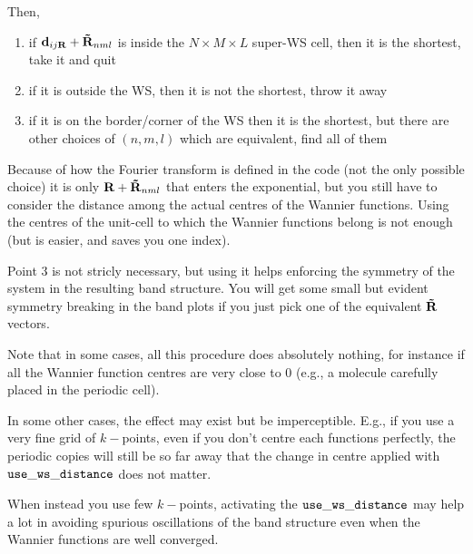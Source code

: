 Then,
\begin{enumerate}
\item if $\bm{\mathrm{d}}_{ij\bm{\mathrm{R}}}+ \bm{\mathrm{\tilde R}}_{nml}$ is inside the  
  $N\times M \times L$ super-WS cell, then it is the shortest, take it and quit

\item if it is outside the WS, then it is not the shortest, throw it away

\item if it is on the border/corner of the WS then it is the shortest, but there 
are other choices of $(n,m,l)$ which are equivalent, find all of them
\end{enumerate}

Because of how the Fourier transform is defined in the \wannier{} code (not the only 
possible choice) it is only $\bm{\mathrm{R}}+\bm{\mathrm{\tilde R}}_{nml}$ 
that enters the exponential, but you still have to consider the distance 
among the actual centres of the Wannier functions. Using 
the centres of the unit-cell to which the Wannier functions belong 
is not enough (but is easier, and saves you one index).

Point 3 is not stricly necessary, but using it helps enforcing the 
symmetry of the system in the resulting band structure. You 
will get some small but evident symmetry breaking in the band 
plots if you just pick one of the equivalent $\bm{\mathrm{\tilde R}}$ vectors.

Note that in some cases, all this procedure does absolutely nothing,
for instance if all the Wannier function centres are very close to 0 
(e.g., a molecule carefully placed in the periodic cell).

In some other cases, the effect may exist but be imperceptible. E.g.,
if you use a very fine grid of $k-$points, even if you don't centre 
each functions perfectly, the periodic copies will still be so far away 
that the change in centre applied with $\tt use\_ws\_distance$ does not matter. 

When instead you use few $k-$points, activating the $\tt use\_ws\_distance$
may help a lot in avoiding spurious oscillations of the band structure
even when the Wannier functions are well converged.
